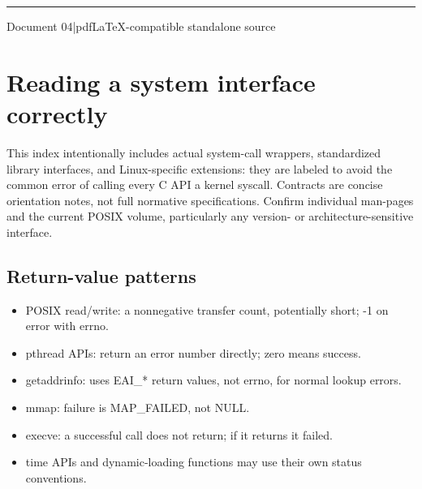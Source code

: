 \documentclass[11pt,letterpaper,oneside]{report}
\begin{document}
\hypersetup{pageanchor=false}%
\begin{titlepage}\centering{}\vspace{0.6cm}{\Large Return contracts, portability, ownership and failure modes\par}\vspace{2cm}\rule{0.75\textwidth}{1.2pt}\par\vspace{0.55cm}{\large An original companion to Michael Kerrisk\textquotesingle s 2010 text}\par\vspace{0.3cm}{\large Edition 1.0\quad |\quad October 2026}\par\vfill{\small Document 04\quad |\quad pdfLaTeX-compatible standalone source}\par\end{titlepage}\hypersetup{pageanchor=true}
\tableofcontents\clearpage
\chapter{Reading a system interface correctly}
This index intentionally includes actual system-call wrappers, standardized library interfaces, and Linux-specific extensions: they are labeled to avoid the common error of calling every C API a kernel syscall. Contracts are concise orientation notes, not full normative specifications. Confirm individual man-pages and the current POSIX volume, particularly any version- or architecture-sensitive interface.

\section{Return-value patterns}
\begin{itemize}
\item POSIX read/write: a nonnegative transfer count, potentially short; -1 on error with errno.
\item pthread APIs: return an error number directly; zero means success.
\item getaddrinfo: uses EAI\_* return values, not errno, for normal lookup errors.
\item mmap: failure is MAP\_FAILED, not NULL.
\item execve: a successful call does not return; if it returns it failed.
\item time APIs and dynamic-loading functions may use their own status conventions.
\end{itemize}
\end{document}
